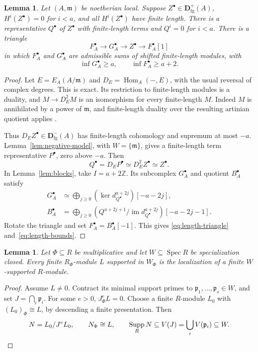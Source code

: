 \documentclass[11pt]{amsart}
\numberwithin{equation}{section}
\newtheorem{lemma}[theorem]{Lemma}
\theoremstyle{definition}
\theoremstyle{remark}
\DeclareMathOperator{\Supp}{Supp}
\DeclareMathOperator{\Spec}{Spec}
\DeclareMathOperator{\Hom}{Hom}
\DeclareMathOperator{\im}{im}
\newcommand{\D}{\mathbf D}
\newcommand{\fg}{\mathrm{fg}}
\newcommand{\p}{\mathfrak p}
\newcommand{\m}{\mathfrak m}
\begin{document}
\begin{lemma}\label{lem:local-length-model}
Let $(A,\m)$ be noetherian local. Suppose $Z^{\bullet}\in\D^+_{\fg}(A)$,
$H^i(Z^{\bullet})=0$ for $i<a$, and all $H^i(Z^{\bullet})$ have finite length. There is a
representative $Q^{\bullet}$ of $Z^{\bullet}$ with finite-length terms and $Q^i=0$ for $i<a$.
There is a triangle
\begin{equation}\label{eq:length-triangle}
 F_A^{\bullet}\longrightarrow G_A^{\bullet}\longrightarrow Z^{\bullet}\longrightarrow F_A^{\bullet}[1]
\end{equation}
in which $F_A^{\bullet}$ and $G_A^{\bullet}$ are admissible sums of shifted finite-length
modules, with
\begin{equation}\label{eq:length-bounds}
 \inf G_A^{\bullet}\geq a,\qquad \inf F_A^{\bullet}\geq a+2.
\end{equation}
\end{lemma}
\begin{proof}
Let $E=E_A(A/\m)$ and $D_E=\Hom_A(-,E)$, with the usual reversal of complex
degrees. This is exact. Its restriction to finite-length modules is a
duality, and $M\to D_E^2M$ is an isomorphism for every finite-length $M$.
Indeed $M$ is annihilated by a power of $\m$, and finite-length duality over
the resulting artinian quotient applies
\cite[Section~47.6 and Lemma~47.7.1, Tags~08YW and~08Z2]{Stacks}.

Thus $D_E Z^{\bullet}\in\D^-_{\fg}(A)$ has finite-length cohomology and supremum at
most $-a$. Lemma~\ref{lem:negative-model}, with $W=\{\m\}$, gives a
finite-length term representative $P^{\bullet}$, zero above $-a$. Then
\[
 Q^{\bullet}=D_E P^{\bullet}\simeq D_E^2Z^{\bullet}\simeq Z^{\bullet}.
\]
In Lemma~\ref{lem:blocks}, take $I=a+2\mathbb Z$. Its subcomplex
$G_A^{\bullet}$ and quotient $B_A^{\bullet}$ satisfy
\[
 \begin{aligned}
 G_A^{\bullet}&\simeq\bigoplus_{j\geq0}(\ker d_{Q^{\bullet}}^{a+2j})[-a-2j],\\
 B_A^{\bullet}&=\bigoplus_{j\geq0}
 (Q^{a+2j+1}/\im d_{Q^{\bullet}}^{a+2j})[-a-2j-1].
 \end{aligned}
\]
Rotate the triangle and set $F_A^{\bullet}=B_A^{\bullet}[-1]$. This gives
\eqref{eq:length-triangle} and~\eqref{eq:length-bounds}.
\end{proof}

\begin{lemma}\label{lem:supported-descent}
Let $\Phi\subseteq R$ be multiplicative and let $W\subseteq\Spec R$
be specialization closed. Every finite $R_\Phi$-module $L$ supported
in $W_\Phi$ is the localization of a finite $W$-supported $R$-module.
\end{lemma}
\begin{proof}
Assume $L\ne0$. Contract its minimal support primes to
$\p_1,\ldots,\p_s\in W$, and set $J=\bigcap_i\p_i$.
For some $e>0$, $J_\Phi^eL=0$. Choose a finite $R$-module $L_0$
with $(L_0)_\Phi\cong L$, by descending a finite presentation.
Then
\[
 N=L_0/J^eL_0,\qquad N_\Phi\cong L,\qquad
 \Supp_RN\subseteq V(J)=\bigcup_iV(\p_i)\subseteq W.\qedhere
\]
\end{proof}
\end{document}

